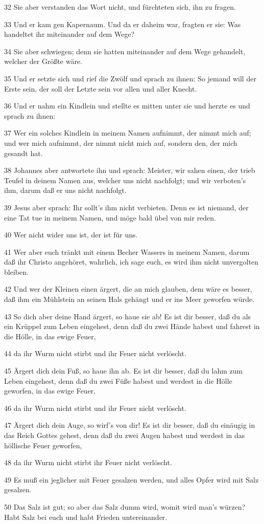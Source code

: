 \par 32 Sie aber verstanden das Wort nicht, und fürchteten sich, ihn zu fragen.
\par 33 Und er kam gen Kapernaum. Und da er daheim war, fragten er sie: Was handeltet ihr miteinander auf dem Wege?
\par 34 Sie aber schwiegen; denn sie hatten miteinander auf dem Wege gehandelt, welcher der Größte wäre.
\par 35 Und er setzte sich und rief die Zwölf und sprach zu ihnen: So jemand will der Erste sein, der soll der Letzte sein vor allen und aller Knecht.
\par 36 Und er nahm ein Kindlein und stellte es mitten unter sie und herzte es und sprach zu ihnen:
\par 37 Wer ein solches Kindlein in meinem Namen aufnimmt, der nimmt mich auf; und wer mich aufnimmt, der nimmt nicht mich auf, sondern den, der mich gesandt hat.
\par 38 Johannes aber antwortete ihn und sprach: Meister, wir sahen einen, der trieb Teufel in deinem Namen aus, welcher uns nicht nachfolgt; und wir verboten's ihm, darum daß er uns nicht nachfolgt.
\par 39 Jesus aber sprach: Ihr sollt's ihm nicht verbieten. Denn es ist niemand, der eine Tat tue in meinem Namen, und möge bald übel von mir reden.
\par 40 Wer nicht wider uns ist, der ist für uns.
\par 41 Wer aber euch tränkt mit einem Becher Wassers in meinem Namen, darum daß ihr Christo angehöret, wahrlich, ich sage euch, es wird ihm nicht unvergolten bleiben.
\par 42 Und wer der Kleinen einen ärgert, die an mich glauben, dem wäre es besser, daß ihm ein Mühlstein an seinen Hals gehängt und er ins Meer geworfen würde.
\par 43 So dich aber deine Hand ärgert, so haue sie ab! Es ist dir besser, daß du als ein Krüppel zum Leben eingehest, denn daß du zwei Hände habest und fahrest in die Hölle, in das ewige Feuer,
\par 44 da ihr Wurm nicht stirbt und ihr Feuer nicht verlöscht.
\par 45 Ärgert dich dein Fuß, so haue ihn ab. Es ist dir besser, daß du lahm zum Leben eingehest, denn daß du zwei Füße habest und werdest in die Hölle geworfen, in das ewige Feuer,
\par 46 da ihr Wurm nicht stirbt und ihr Feuer nicht verlöscht.
\par 47 Ärgert dich dein Auge, so wirf's von dir! Es ist dir besser, daß du einäugig in das Reich Gottes gehest, denn daß du zwei Augen habest und werdest in das höllische Feuer geworfen,
\par 48 da ihr Wurm nicht stirbt ihr Feuer nicht verlöscht.
\par 49 Es muß ein jeglicher mit Feuer gesalzen werden, und alles Opfer wird mit Salz gesalzen.
\par 50 Das Salz ist gut; so aber das Salz dumm wird, womit wird man's würzen? Habt Salz bei euch und habt Frieden untereinander.

